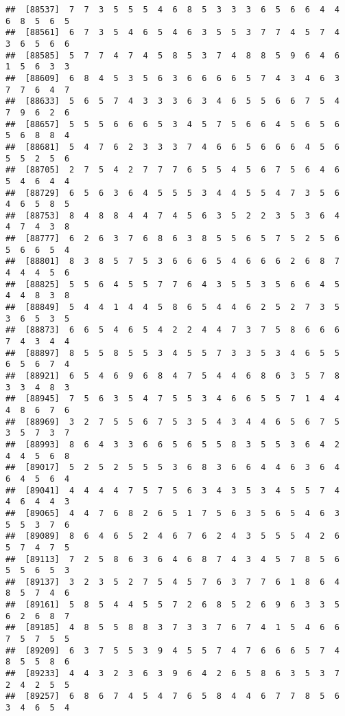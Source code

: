 \documentclass[
]{book}
\begin{document}
\begin{verbatim}
##  [88537]  7  7  3  5  5  5  4  6  8  5  3  3  3  6  5  6  6  4  4  6  8  5  6  5
##  [88561]  6  7  3  5  4  6  5  4  6  3  5  5  3  7  7  4  5  7  4  3  6  5  6  6
##  [88585]  5  7  7  4  7  4  5  8  5  3  7  4  8  8  5  9  6  4  6  1  5  6  3  3
##  [88609]  6  8  4  5  3  5  6  3  6  6  6  6  5  7  4  3  4  6  3  7  7  6  4  7
##  [88633]  5  6  5  7  4  3  3  3  6  3  4  6  5  5  6  6  7  5  4  7  9  6  2  6
##  [88657]  5  5  5  6  6  6  5  3  4  5  7  5  6  6  4  5  6  5  6  5  6  8  8  4
##  [88681]  5  4  7  6  2  3  3  3  7  4  6  6  5  6  6  6  4  5  6  5  5  2  5  6
##  [88705]  2  7  5  4  2  7  7  7  6  5  5  4  5  6  7  5  6  4  6  5  4  6  4  4
##  [88729]  6  5  6  3  6  4  5  5  5  3  4  4  5  5  4  7  3  5  6  4  6  5  8  5
##  [88753]  8  4  8  8  4  4  7  4  5  6  3  5  2  2  3  5  3  6  4  4  7  4  3  8
##  [88777]  6  2  6  3  7  6  8  6  3  8  5  5  6  5  7  5  2  5  6  5  6  6  5  4
##  [88801]  8  3  8  5  7  5  3  6  6  6  5  4  6  6  6  2  6  8  7  4  4  4  5  6
##  [88825]  5  5  6  4  5  5  7  7  6  4  3  5  5  3  5  6  6  4  5  4  4  8  3  8
##  [88849]  5  4  4  1  4  4  5  8  6  5  4  4  6  2  5  2  7  3  5  3  6  5  3  5
##  [88873]  6  6  5  4  6  5  4  2  2  4  4  7  3  7  5  8  6  6  6  7  4  3  4  4
##  [88897]  8  5  5  8  5  5  3  4  5  5  7  3  3  5  3  4  6  5  5  6  5  6  7  4
##  [88921]  6  5  4  6  9  6  8  4  7  5  4  4  6  8  6  3  5  7  8  3  3  4  8  3
##  [88945]  7  5  6  3  5  4  7  5  5  3  4  6  6  5  5  7  1  4  4  4  8  6  7  6
##  [88969]  3  2  7  5  5  6  7  5  3  5  4  3  4  4  6  5  6  7  5  3  5  7  3  7
##  [88993]  8  6  4  3  3  6  6  5  6  5  5  8  3  5  5  3  6  4  2  4  4  5  6  8
##  [89017]  5  2  5  2  5  5  5  3  6  8  3  6  6  4  4  6  3  6  4  6  4  5  6  4
##  [89041]  4  4  4  4  7  5  7  5  6  3  4  3  5  3  4  5  5  7  4  4  6  4  4  3
##  [89065]  4  4  7  6  8  2  6  5  1  7  5  6  3  5  6  5  4  6  3  5  5  3  7  6
##  [89089]  8  6  4  6  5  2  4  6  7  6  2  4  3  5  5  5  4  2  6  5  7  4  7  5
##  [89113]  7  2  5  8  6  3  6  4  6  8  7  4  3  4  5  7  8  5  6  5  5  6  5  3
##  [89137]  3  2  3  5  2  7  5  4  5  7  6  3  7  7  6  1  8  6  4  8  5  7  4  6
##  [89161]  5  8  5  4  4  5  5  7  2  6  8  5  2  6  9  6  3  3  5  6  2  6  8  7
##  [89185]  4  8  5  5  8  8  3  7  3  3  7  6  7  4  1  5  4  6  6  7  5  7  5  5
##  [89209]  6  3  7  5  5  3  9  4  5  5  7  4  7  6  6  6  5  7  4  8  5  5  8  6
##  [89233]  4  4  3  2  3  6  3  9  6  4  2  6  5  8  6  3  5  3  7  2  4  2  5  5
##  [89257]  6  8  6  7  4  5  4  7  6  5  8  4  4  6  7  7  8  5  6  3  4  6  5  4

\end{verbatim}
\end{document}
